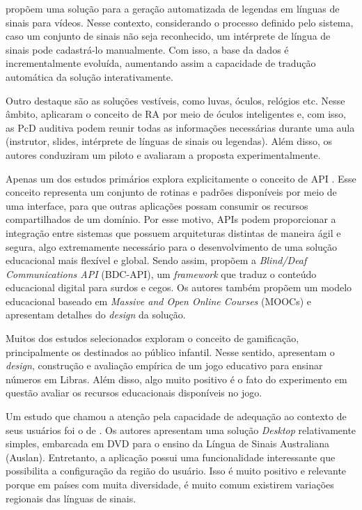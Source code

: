  propõem uma solução para a geração automatizada de legendas em línguas de sinais para vídeos. Nesse contexto, considerando o processo definido pelo sistema, caso um conjunto de sinais não seja reconhecido, um intérprete de língua de sinais pode cadastrá-lo manualmente. Com isso, a base da dados é incrementalmente evoluída, aumentando assim a capacidade de tradução automática da solução interativamente.

Outro destaque são as soluções vestíveis, como luvas, óculos, relógios etc. Nesse âmbito,  aplicaram o conceito de RA por meio de óculos inteligentes e, com isso, as PcD auditiva podem reunir todas as informações necessárias durante uma aula (instrutor, slides, intérprete de línguas de sinais ou legendas). Além disso, os autores conduziram um piloto e avaliaram a proposta experimentalmente.

Apenas um dos estudos primários explora explicitamente o conceito de API \cite{INT56}. Esse conceito representa um conjunto de rotinas e padrões disponíveis por meio de uma interface, para que outras aplicações possam consumir os recursos compartilhados de um domínio. Por esse motivo, APIs podem proporcionar a integração entre sistemas que possuem arquiteturas distintas de maneira ágil e segura, algo extremamente necessário para o desenvolvimento de uma solução educacional mais flexível e global. Sendo assim,  propõem a \textit{Blind/Deaf Communications API} (BDC-API), um \textit{framework} que traduz o conteúdo educacional digital para surdos e cegos. Os autores também propõem um modelo educacional baseado em \textit{Massive and Open Online Courses} (MOOCs) e apresentam detalhes do \textit{design} da solução.

Muitos dos estudos selecionados exploram o conceito de gamificação, principalmente os destinados ao público infantil. Nesse sentido,  apresentam o \textit{design}, construção e avaliação empírica de um jogo educativo para ensinar números em Libras. Além disso, algo muito positivo é o fato do experimento em questão avaliar os recursos educacionais disponíveis no jogo.

Um estudo que chamou a atenção pela capacidade de adequação ao contexto de seus usuários foi o de . Os autores apresentam uma solução \textit{Desktop} relativamente simples, embarcada em DVD para o ensino da Língua de Sinais Australiana (Auslan). Entretanto, a aplicação possui uma funcionalidade interessante que possibilita a configuração da região do usuário. Isso é muito positivo e relevante porque em países com muita diversidade, é muito comum existirem variações regionais das línguas de sinais.

